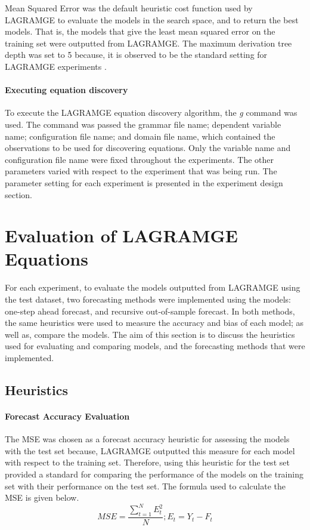 \documentclass[13pt]{report}
\begin{document}
Mean Squared Error was the default heuristic cost function used by LAGRAMGE to evaluate the models in the search space, and to return the best models. That is, the models that give the least mean squared error on the training set were outputted from LAGRAMGE. The maximum derivation tree depth was set to 5 because, it is observed to be the standard setting for LAGRAMGE experiments \cite{lagramgeman,georgiev2015learning,georgiev2015learning2,kazakov2009equation
}.

\paragraph{Executing equation discovery} \hfill \break
To execute the LAGRAMGE equation discovery algorithm, the \textit{g} command was used\cite{lagramgeman}. The command was passed the grammar file name; dependent variable name; configuration file name; and domain file name, which contained the observations to be used for discovering equations. Only the variable name and configuration file name were fixed throughout the experiments. The other parameters varied with respect to the experiment that was being run. The parameter setting for each experiment is presented in the experiment design section.


\section{Evaluation of LAGRAMGE Equations}
For each experiment, to evaluate the models outputted from LAGRAMGE using the test dataset, two forecasting methods were implemented using the models: one-step ahead forecast, and recursive out-of-sample forecast. In both methods, the same heuristics were used to measure the accuracy and bias of each model; as well as, compare the models. The aim of this section is to discuss the heuristics used for evaluating and comparing models, and the forecasting methods that were implemented. 

\subsection{Heuristics} 

\paragraph{Forecast Accuracy Evaluation}\hfill \break
The MSE was chosen as a forecast accuracy heuristic for assessing the models with the test set because, LAGRAMGE outputted this measure for each model with respect to the training set. Therefore, using this heuristic for the test set provided a standard for comparing the performance of the models on the training set with their performance on the test set. The formula used to calculate the MSE is given below.
\[MSE = \frac{\sum_{t=1}^{N}E_{t}^{2}}{N}; E_{t} = Y_{t}-F_{t} \] 
\end{document}
